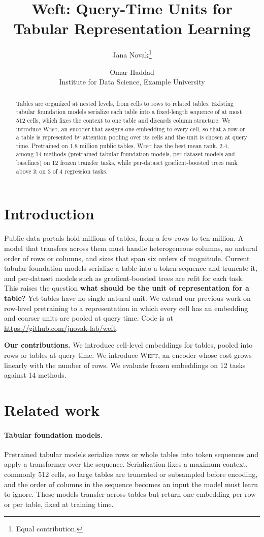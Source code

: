 \documentclass{article}
\title{Weft: Query-Time Units for Tabular Representation Learning}
\author{Jana Novak\thanks{Equal contribution.} \and Omar Haddad\\ Institute for Data Science, Example University}
\newcommand{\weft}{\textsc{Weft}}
\begin{document}
\maketitle

\begin{abstract}
Tables are organized at nested levels, from cells to rows to related tables. Existing tabular foundation models serialize each table into a fixed-length sequence of at most 512 cells, which fixes the context to one table and discards column structure. We introduce \weft{}, an encoder that assigns one embedding to every cell, so that a row or a table is represented by attention pooling over its cells and the unit is chosen at query time. Pretrained on 1.8 million public tables, \weft{} has the best mean rank, 2.4, among 14 methods (pretrained tabular foundation models, per-dataset models and baselines) on 12 frozen transfer tasks, while per-dataset gradient-boosted trees rank above it on 3 of 4 regression tasks.
\end{abstract}

\section{Introduction}
Public data portals hold millions of tables, from a few rows to ten million. A model that transfers across them must handle heterogeneous columns, no natural order of rows or columns, and sizes that span six orders of magnitude. Current tabular foundation models serialize a table into a token sequence and truncate it, and per-dataset models such as gradient-boosted trees \citep{chen2016xgboost} are refit for each task. This raises the question \textbf{what should be the unit of representation for a table?} Yet tables have no single natural unit. We extend our previous work on row-level pretraining \citep{novak2025rows} to a representation in which every cell has an embedding and coarser units are pooled at query time. Code is at \url{https://github.com/jnovak-lab/weft}.

\textbf{Our contributions.} We introduce cell-level embeddings for tables, pooled into rows or tables at query time. We introduce \weft{}, an encoder whose cost grows linearly with the number of rows. We evaluate frozen embeddings on 12 tasks against 14 methods.

\section{Related work}
\paragraph{Tabular foundation models.} Pretrained tabular models serialize rows or whole tables into token sequences and apply a transformer over the sequence. Serialization fixes a maximum context, commonly 512 cells, so large tables are truncated or subsampled before encoding, and the order of columns in the sequence becomes an input the model must learn to ignore. These models transfer across tables but return one embedding per row or per table, fixed at training time.
\end{document}
